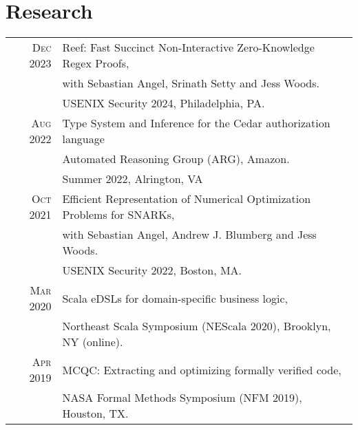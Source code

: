 \documentclass[lettersize,11pt]{article}
\begin{document}
\section{Research}
\begin{tabular}{rl}
    \textsc{Dec} 2023 & Reef: Fast Succinct Non-Interactive Zero-Knowledge Regex Proofs, \\
                      & with Sebastian Angel, Srinath Setty and Jess Woods. \\
                      & USENIX Security 2024, Philadelphia, PA.  \\[0.5em]
    \textsc{Aug} 2022 & Type System and Inference for the Cedar authorization
    language \\
                      & Automated Reasoning Group (ARG), Amazon. \\
                      & Summer 2022, Alrington, VA \\ [0.5em]
    \textsc{Oct} 2021 & Efficient Representation of Numerical Optimization Problems for SNARKs, \\
                      & with Sebastian Angel, Andrew J. Blumberg and Jess Woods. \\
                      & USENIX Security 2022, Boston, MA.  \\[0.5em]
    \textsc{Mar} 2020 & Scala eDSLs for domain-specific business logic, \\
                      & Northeast Scala Symposium (NEScala 2020), Brooklyn, NY (online). \\[0.5em]
    \textsc{Apr} 2019 & MCQC: Extracting and optimizing formally verified code, \\
                      & NASA Formal Methods Symposium (NFM 2019), Houston, TX. \\
\end{tabular}
\end{document}

